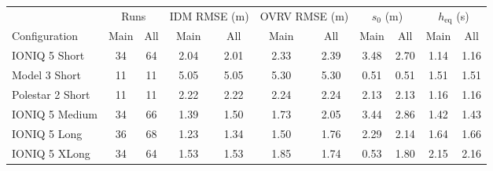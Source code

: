 \setlength{\tabcolsep}{3pt}
\begin{tabular}{lcccccccccc}
\toprule
 & \multicolumn{2}{c}{Runs} & \multicolumn{2}{c}{IDM RMSE (m)} & \multicolumn{2}{c}{OVRV RMSE (m)} & \multicolumn{2}{c}{$s_0$ (m)} & \multicolumn{2}{c}{$h_{\mathrm{eq}}$ (s)} \\
\cmidrule(lr){2-3}\cmidrule(lr){4-5}\cmidrule(lr){6-7}\cmidrule(lr){8-9}\cmidrule(lr){10-11}
Configuration & Main & All & Main & All & Main & All & Main & All & Main & All \\
\midrule
IONIQ 5 Short & 34 & 64 & 2.04 & 2.01 & 2.33 & 2.39 & 3.48 & 2.70 & 1.14 & 1.16 \\
Model 3 Short & 11 & 11 & 5.05 & 5.05 & 5.30 & 5.30 & 0.51 & 0.51 & 1.51 & 1.51 \\
Polestar 2 Short & 11 & 11 & 2.22 & 2.22 & 2.24 & 2.24 & 2.13 & 2.13 & 1.16 & 1.16 \\
IONIQ 5 Medium & 34 & 66 & 1.39 & 1.50 & 1.73 & 2.05 & 3.44 & 2.86 & 1.42 & 1.43 \\
IONIQ 5 Long & 36 & 68 & 1.23 & 1.34 & 1.50 & 1.76 & 2.29 & 2.14 & 1.64 & 1.66 \\
IONIQ 5 XLong & 34 & 64 & 1.53 & 1.53 & 1.85 & 1.74 & 0.53 & 1.80 & 2.15 & 2.16 \\
\bottomrule
\end{tabular}
